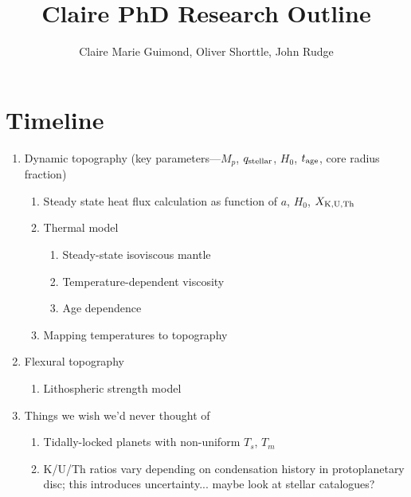 \documentclass[10pt,a4paper]{article}
\author{Claire Marie Guimond, Oliver Shorttle, John Rudge}
\title{Claire PhD Research Outline}
\begin{document}
\maketitle
\section{Timeline}
\begin{enumerate}
\item Dynamic topography (key parameters---$M_p$, $q_{\rm stellar}$, $H_0$, $t_{\rm age}$, core radius fraction) 
	\begin{enumerate}
	\item Steady state heat flux calculation as function of $a$, $H_0$, $X_{\rm K, U, Th}$
	\item Thermal model
	
		\begin{enumerate}
		
		\item Steady-state isoviscous mantle
		\item Temperature-dependent viscosity
		\item Age dependence
		\end{enumerate}
	\item Mapping temperatures to topography
	\end{enumerate}
		
\item Flexural topography
	\begin{enumerate}
	\item Lithospheric strength model
	\end{enumerate}
	
\item Things we wish we'd never thought of
	\begin{enumerate}
	\item Tidally-locked planets with non-uniform $T_s$, $T_m$
	\item K/U/Th ratios vary depending on condensation history in protoplanetary disc; this introduces uncertainty... maybe look at stellar catalogues?
	\end{enumerate}
	
\end{enumerate}
	
		
\end{document}
